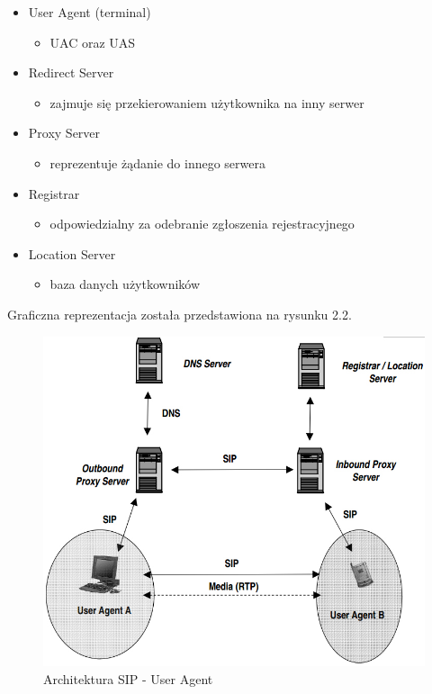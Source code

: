 \begin{itemize}
	\item User Agent (terminal)
	\begin{itemize}
		\item UAC oraz UAS
	\end{itemize}
\end{itemize}

\begin{itemize}
	\item Redirect Server
	\begin{itemize}
		\item zajmuje się przekierowaniem użytkownika na inny serwer
	\end{itemize}
\end{itemize}

\begin{itemize}
	\item Proxy Server
	\begin{itemize}
		\item reprezentuje żądanie do innego serwera
	\end{itemize}
\end{itemize}

\begin{itemize}
	\item Registrar
	\begin{itemize}
		\item odpowiedzialny za odebranie zgłoszenia rejestracyjnego
	\end{itemize}
\end{itemize}

\begin{itemize}
	\item Location Server
	\begin{itemize}
		\item baza danych użytkowników 
	\end{itemize}
\end{itemize}

Graficzna reprezentacja została przedstawiona na rysunku 2.2.
\begin{figure}[H]
	\centering
	\includegraphics[width=0.7\linewidth]{architektura}
	\caption{Architektura SIP - User Agent}
	\label{fig:architektura}
\end{figure}
\newpage

